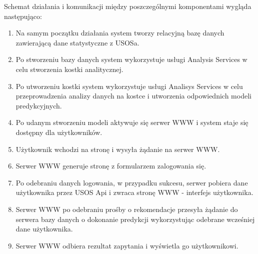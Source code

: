 \documentclass[licencjacka]{pracamgr}
\begin{document}
\newpage

Schemat działania i komunikacji między poszczególnymi komponentami wygląda następująco:
\begin{enumerate}

\item Na samym początku działania system tworzy relacyjną bazę danych zawierającą dane statystyczne z USOSa. 

\item Po stworzeniu bazy danych system wykorzystuje usługi Analysis Services w celu stworzenia kostki analitycznej.

\item Po utworzeniu kostki system wykorzystuje usługi Analisys Services w celu przeprowadzenia analizy
danych na kostce i utworzenia odpowiednich modeli predykcyjnych.

\item Po udanym stworzeniu modeli aktywuje się serwer WWW i system staje się dostępny dla użytkowników. 

\item Użytkownik wchodzi na stronę i wysyła żądanie na serwer WWW.

\item Serwer WWW generuje stronę z formularzem zalogowania się.

\item Po odebraniu danych logowania, w przypadku sukcesu, serwer pobiera dane użytkownika przez USOS Api i zwraca stronę WWW - interfejs użytkownika.

\item Serwer WWW po odebraniu prośby o rekomendacje przesyła żądanie do serwera bazy danych o dokonanie predykcji wykorzystując odebrane wcześniej dane użytkownika.

\item Serwer WWW odbiera rezultat zapytania i wyświetla go użytkownikowi.

\end{enumerate}
\end{document}
